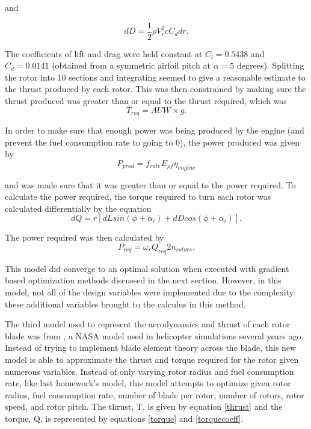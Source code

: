 \documentclass[letterpaper, 10 pt, conference]{ieeeconf}  %
\begin{document}
and 

\begin{equation}
	dD = \frac{1}{2}\rho V_e^2 c C_d dr.
\end{equation}

The coefficients of lift and drag were held constant at $C_l = 0.5438$ and $C_d = 0.0141$ (obtained from a symmetric airfoil pitch at $\alpha = 5$ degrees). Splitting the rotor into 10 sections and integrating seemed to give a reasonable estimate to the thrust produced by each rotor. This was then constrained by making sure the thrust produced was greater than or equal to the thrust required, which was
\begin{equation}
	T_{req} = AUW\times g.
\end{equation}

In order to make sure that enough power was being produced by the engine (and prevent the fuel consumption rate to going to 0), the power produced was given by 
\begin{equation}
	P_{prod} = f_{rate}E_{\rho f} \eta_{engine}
\end{equation}

and was made sure that it was greater than or equal to the power required. To calculate the power required, the torque required to turn each rotor was calculated differentially by the equation
\begin{equation}
	dQ = r[dLsin(\phi + \alpha_i) + dDcos(\phi + \alpha_i)].
\end{equation}

The power required was then calculated by 
\begin{equation}
	P_{req} = \omega_rQ_{req}2n_{rotors}.
\end{equation}

This model did converge to an optimal solution when executed with gradient based optimization methods discussed in the next section. However, in this model, not all of the design variables were implemented due to the complexity these additional variables brought to the calculus in this method.

The third model used to represent the aerodynamics and thrust of each rotor blade was from \cite{chen1979simplified}, a NASA model used in helicopter simulations several years ago. Instead of trying to implement blade element theory across the blade, this new model is able to approximate the thrust and torque required for the rotor given numerous variables. Instead of only varying rotor radius and fuel consumption rate, like last homework's model, this model attempts to optimize given rotor radius, fuel consumption rate, number of blade per rotor, number of rotors, rotor speed, and rotor pitch. The thrust, T, is given by equation \ref{thrust} and the torque, Q, is represented by equations \ref{torque} and \ref{torquecoeff}.
\end{document}

